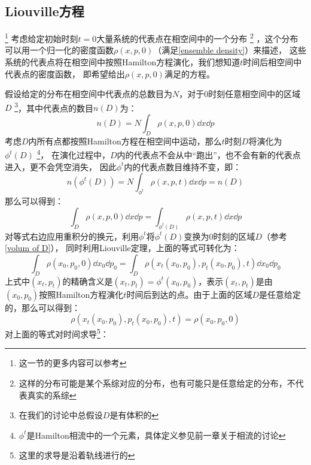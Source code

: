     \subsection{Liouville方程}
    \footnote{这一节的更多内容可以参考\cite{Tuckerman2010Statistical2}}
    考虑给定初始时刻$t=0$大量系统的代表点在相空间中的一个分布
    \footnote{这样的分布可能是某个系综对应的分布，也有可能只是任意给定的分布，不代表真实的系综}
    ，这个分布可以用一个归一化的密度函数$\rho(x, p, 0)$（满足\ref{ensemble density}）来描述，
    这些系统的代表点将在相空间中按照Hamilton方程演化，我们想知道$t$时间后相空间中代表点的密度函数，
    即希望给出$\rho(x, p, 0)$满足的方程。
    \par
    假设给定的分布在相空间中代表点的总数目为$N$，对于0时刻任意相空间中的区域$D$
    \footnote{在我们的讨论中总假设$D$是有体积的}，其中代表点的数目$n(D)$为：
    \begin{equation}
        n(D) = N\int_{D}\rho(x, p, 0)\dd x\dd p
    \end{equation}
    考虑$D$内所有点都按照Hamilton方程在相空间中运动，那么$t$时刻$D$将演化为$\phi^t(D)$
    \footnote{$\phi^t$是Hamilton相流中的一个元素，具体定义参见前一章关于相流的讨论}，
    在演化过程中，$D$内的代表点不会从中“跑出”，也不会有新的代表点进入，更不会凭空消失，
    因此$\phi^t$内的代表点数目维持不变，即：
    \begin{equation}
        n(\phi^t(D)) = N\int_{\phi^t}\rho(x, p, t)\dd x\dd p = n(D)
    \end{equation}
    那么可以得到：
    \begin{equation}
        \int_{D}\rho(x, p, 0)\dd x\dd p = \int_{\phi^t(D)}\rho(x, p, t)\dd x\dd p
    \end{equation}
    对等式右边应用重积分的换元，利用$\phi^t$将$\phi^t(D)$变换为0时刻的区域$D$（参考\ref{volum of D}），
    同时利用Liouville定理，上面的等式可转化为：
    \begin{equation}
        \int_{D}\rho(x_0, p_0, 0)\dd x_0\dd p_0 = \int_{D}\rho(x_t(x_0, p_0), p_t(x_0, p_0), t)\dd x_0 \dd p_0
    \end{equation}
    上式中$(x_t, p_t)$的精确含义是$(x_t, p_t) = \phi^t(x_0, p_0)$，表示$(x_t, p_t)$是由
    $(x_0, p_0)$按照Hamilton方程演化$t$时间后到达的点。由于上面的区域$D$是任意给定的，那么可以得到：
    \begin{equation}
        \rho(x_t(x_0, p_0), p_t(x_0, p_0), t) = \rho(x_0, p_0, 0)
        \label{Liouville equation Lagrange}
    \end{equation}
    对上面的等式对时间求导\footnote{这里的求导是沿着轨线进行的}：

